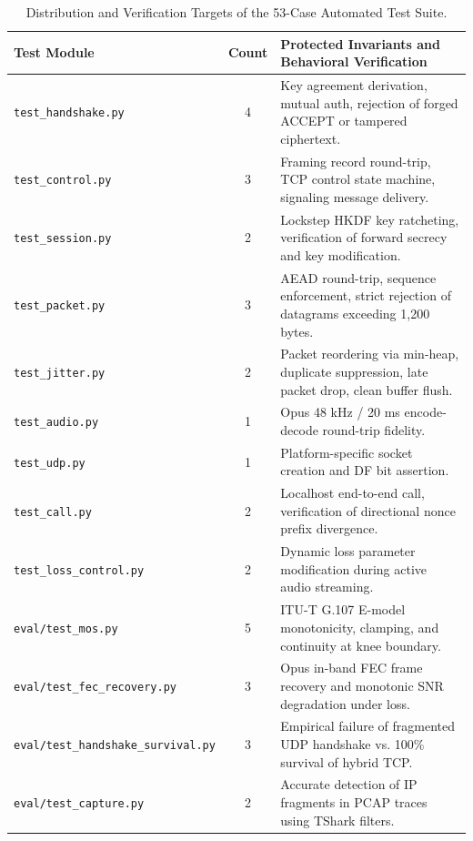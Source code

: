 \begin{table}[htbp]
    \centering
    \caption{Distribution and Verification Targets of the 53-Case Automated Test Suite.}
    \label{tab:test_suite}
    \small
    \begin{tabularx}{\textwidth}{>{\raggedright\arraybackslash}p{4.2cm} c >{\raggedright\arraybackslash}X}
        \toprule
        \textbf{Test Module} & \textbf{Count} & \textbf{Protected Invariants and Behavioral Verification} \\
        \midrule
        \texttt{test\_handshake.py} & 4 & Key agreement derivation, mutual auth, rejection of forged ACCEPT or tampered ciphertext. \\
        \texttt{test\_control.py} & 3 & Framing record round-trip, TCP control state machine, signaling message delivery. \\
        \texttt{test\_session.py} & 2 & Lockstep HKDF key ratcheting, verification of forward secrecy and key modification. \\
        \texttt{test\_packet.py} & 3 & AEAD round-trip, sequence enforcement, strict rejection of datagrams exceeding 1,200 bytes. \\
        \texttt{test\_jitter.py} & 2 & Packet reordering via min-heap, duplicate suppression, late packet drop, clean buffer flush. \\
        \texttt{test\_audio.py} & 1 & Opus 48 kHz / 20 ms encode-decode round-trip fidelity. \\
        \texttt{test\_udp.py} & 1 & Platform-specific socket creation and DF bit assertion. \\
        \texttt{test\_call.py} & 2 & Localhost end-to-end call, verification of directional nonce prefix divergence. \\
        \texttt{test\_loss\_control.py} & 2 & Dynamic loss parameter modification during active audio streaming. \\
        \texttt{eval/test\_mos.py} & 5 & ITU-T G.107 E-model monotonicity, clamping, and continuity at knee boundary. \\
        \texttt{eval/test\_fec\_recovery.py} & 3 & Opus in-band FEC frame recovery and monotonic SNR degradation under loss. \\
        \texttt{eval/test\_handshake\_survival.py} & 3 & Empirical failure of fragmented UDP handshake vs. 100\% survival of hybrid TCP. \\
        \texttt{eval/test\_capture.py} & 2 & Accurate detection of IP fragments in PCAP traces using TShark filters. \\

\end{tabularx}
\end{table}
